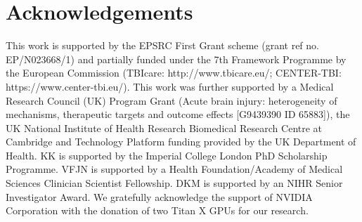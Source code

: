 


\section*{Acknowledgements}

This work is supported by the EPSRC First Grant scheme (grant ref no. EP/N023668/1) and partially funded under the 7th Framework Programme by the European Commission (TBIcare: http://www.tbicare.eu/; CENTER-TBI: https://www.center-tbi.eu/).
This work was further supported by a Medical Research Council (UK) Program Grant (Acute brain injury: heterogeneity of mechanisms, therapeutic targets and outcome effects [G9439390 ID 65883]), the UK National Institute of Health Research Biomedical Research Centre at Cambridge and Technology Platform funding provided by the UK Department of Health. KK is supported by the Imperial College London PhD Scholarship Programme. VFJN is supported by a Health Foundation/Academy of Medical Sciences Clinician Scientist Fellowship. DKM is supported by an NIHR Senior Investigator Award. We gratefully acknowledge the support of NVIDIA Corporation with the donation of two Titan X GPUs for our research.
